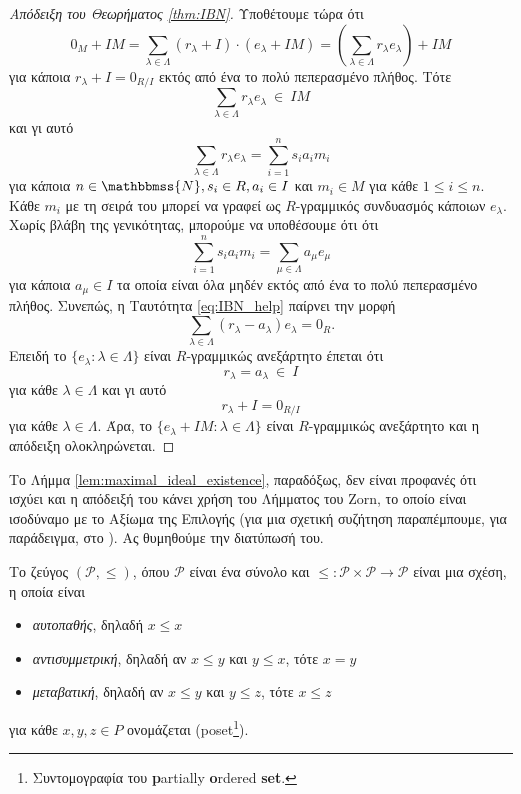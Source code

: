 \documentclass[12pt,a4paper,reqno]{amsart}
\theoremstyle{definition}
\theoremstyle{remark}
\numberwithin{theorem}{section}
\numberwithin{exercise}{section}
\numberwithin{equation}{section}
\newcommand{\NN}{\mathbbmss{N}}
\newcommand{\pP}{\mathcal{P}}
\renewcommand{\to}{\rightarrow}
\newcommand{\defn}[1]{{\color{mylightblue}{#1}}}
\begin{document}
\begin{proof}[Απόδειξη του Θεωρήματος \ref{thm:IBN}]
    Υποθέτουμε τώρα ότι 
    \[
    0_M + IM = \sum_{\lambda \in \Lambda}\left(r_\lambda + I\right)\cdot\left(e_\lambda + IM\right) = \left(\sum_{\lambda \in \Lambda} r_\lambda e_\lambda\right) + IM
    \]
    για κάποια $r_\lambda + I =0_{R/I}$ εκτός από ένα το πολύ πεπερασμένο πλήθος. Τότε  
    \[
    \sum_{\lambda \in \Lambda} r_\lambda e_\lambda \ \in \ IM
    \]
    και γι αυτό 
    \begin{equation}
        \label{eq:IBN_help}
        \sum_{\lambda \in \Lambda} r_\lambda e_\lambda = \sum_{i=1}^n s_ia_im_i
    \end{equation}
    για κάποια $n \in \NN, s_i \in R, a_i \in I$ και $m_i \in M$ για κάθε $1 \le i \le n$. Κάθε $m_i$ με τη σειρά του μπορεί να γραφεί ως $R$-γραμμικός συνδυασμός κάποιων $e_\lambda$. Χωρίς βλάβη της γενικότητας, μπορούμε να υποθέσουμε ότι ότι
    \[
    \sum_{i=1}^n s_ia_im_i = \sum_{\mu \in \Lambda} a_\mu e_\mu
    \]
    για κάποια $a_\mu \in I$ τα οποία είναι όλα μηδέν εκτός από ένα το πολύ πεπερασμένο πλήθος. Συνεπώς, η Ταυτότητα \eqref{eq:IBN_help} παίρνει την μορφή 
    \[
    \sum_{\lambda \in \Lambda} (r_\lambda - a_\lambda) e_\lambda = 0_R.
    \]
    Επειδή το $\{e_\lambda : \lambda \in \Lambda\}$ είναι $R$-γραμμικώς ανεξάρτητο έπεται ότι 
    \[
    r_\lambda = a_\lambda \ \in \ I
    \]
    για κάθε $\lambda \in \Lambda$ και γι αυτό 
    \[
    r_\lambda + I = 0_{R/I}
    \]
    για κάθε $\lambda \in \Lambda$. Άρα, το $\{e_\lambda + IM : \lambda \in \Lambda\}$ είναι $R$-γραμμικώς ανεξάρτητο και η απόδειξη ολοκληρώνεται.
\end{proof}

Το Λήμμα \ref{lem:maximal_ideal_existence}, παραδόξως, δεν είναι προφανές ότι ισχύει και η απόδειξή του κάνει χρήση του Λήμματος του Zorn, το οποίο είναι ισοδύναμο με το Αξίωμα της Επιλογής (για μια σχετική συζήτηση παραπέμπουμε, για παράδειγμα, στο \cite[Παράρτημα~I~2]{DF04}). Ας θυμηθούμε την διατύπωσή του.

Το ζεύγος $(\pP,\leq)$, όπου $\pP$ είναι ένα σύνολο και $\leq : \pP \times \pP \to \pP$ είναι μια σχέση, η οποία είναι 
\begin{itemize}
    \item \emph{αυτοπαθής}, δηλαδή $x \le x$
    \item \emph{αντισυμμετρική}, δηλαδή αν $x \le y$ και $y \le x$, τότε $x = y$
    \item \emph{μεταβατική}, δηλαδή αν $x \le y$ και $y \le z$, τότε $x \leq z$
\end{itemize}
για κάθε $x, y, z \in P$ ονομάζεται \defn{μερική διάταξη} (poset\footnote{Συντομογραφία του {\bf p}artially {\bf o}rdered {\bf set}.}).
\end{document}
